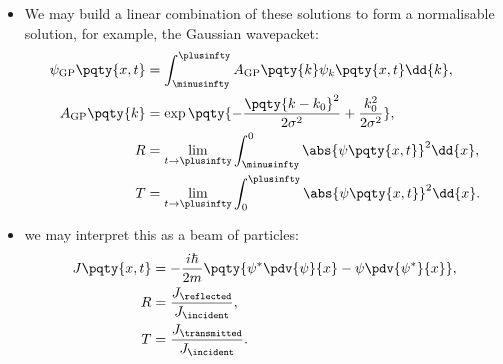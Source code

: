 \begin{itemize}
    \item We may build a linear combination of these solutions to form a normalisable solution, for example, the Gaussian wavepacket:
    \begin{subequations}
        \begin{align}
            \psi_{\text{GP}} \pqty{x, t} &= \int_{\minusinfty}^{\plusinfty} A_{\text{GP}}\pqty{k} \psi_k \pqty{x, t} \dd{k}, \\
            A_{\text{GP}}\pqty{k} &= \exp\pqty{- \frac{\pqty{k - k_0}^2}{2 \sigma^2} + \frac{k_0^2}{2 \sigma^2}}, \\
            R &= \lim_{t \to \plusinfty} \int_{\minusinfty}^{0} \abs{\psi\pqty{x, t}}^2 \dd{x}, \\
            T &= \lim_{t \to \plusinfty} \int_{0}^{\plusinfty} \abs{\psi\pqty{x, t}}^2 \dd{x}.
        \end{align}
    \end{subequations}

    \item we may interpret this as a beam of particles:
    \begin{subequations}
        \begin{align}
            J\pqty{x, t} &= - \frac{i \hbar}{2 m} \pqty{\psi^* \pdv{\psi}{x} - \psi \pdv{\psi^*}{x}}, \\
            R &= \frac{J_{\reflected}}{J_{\incident}}, \\
            T &= \frac{J_{\transmitted}}{J_{\incident}}.
        \end{align}
    \end{subequations}
\end{itemize}
